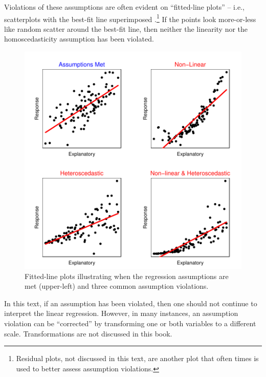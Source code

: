 \documentclass[10pt,openany]{book}\usepackage[]{graphicx}\usepackage[]{color}
\newenvironment{knitrout}{}{} %
\begin{document}
Violations of these assumptions are often evident on ``fitted-line plots'' -- i.e., scatterplots with the best-fit line superimposed .\footnote{Residual plots, not discussed in this text, are another plot that often times is used to better assess assumption violations.}  If the points look more-or-less like random scatter around the best-fit line, then neither the linearity nor the homoscedasticity assumption has been violated.

\begin{knitrout}
\color{fgcolor}\begin{figure}[hbtp]

{\centering \includegraphics[width=.8\linewidth]{Figs/ResidPlotEx-1} 

}

\caption[Fitted-line plots illustrating when the regression assumptions are met (upper-left) and three common assumption violations]{Fitted-line plots illustrating when the regression assumptions are met (upper-left) and three common assumption violations.}\label{fig:ResidPlotEx}
\end{figure}


\end{knitrout}
\vspace{12pt}  %

In this text, if an assumption has been violated, then one should not continue to interpret the linear regression.  However, in many instances, an assumption violation can be ``corrected'' by transforming one or both variables to a different scale.  Transformations are not discussed in this book.
\end{document}
